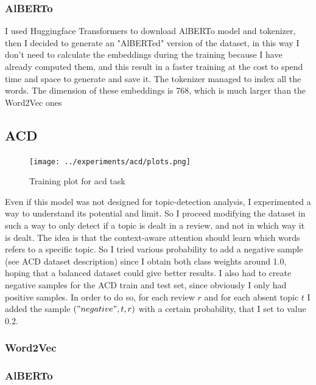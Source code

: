 \documentclass{article}
\begin{document}
            \subsubsection{AlBERTo}
            I used Huggingface Transformers to download AlBERTo model and tokenizer, then I decided to generate an "AlBERTed" version of the dataset,
            in this way I don't need to calculate the embeddings during the training because I have already computed them,
            and this result in a faster training at the cost to spend time and space to generate and save it.
            The tokenizer managed to index all the words.
            The dimension of these embeddings is 768, which is much larger than the Word2Vec ones

        \subsection{ACD}\label{subsec:s2}
            \begin{figure}
                \texttt{[image: ../experiments/acd/plots.png]}
                \caption{Training plot for acd task}
                \label{fig:train-acd}
            \end{figure}
            Even if this model was not designed for topic-detection analysis, I experimented a way to understand its potential and limit.
            So I proceed modifying the dataset in such a way to only detect if a topic is dealt in a review, and not in which way it is dealt.
            The idea is that the context-aware attention should learn which words refers to a specific topic.
            So I tried various probability to add a negative sample (see ACD dataset description) since I obtain both class weights around 1.0, hoping that a balanced dataset could give better results.
            I also had to create negative samples for the ACD train and test set, since obviously I only had positive samples.
            In order to do so, for each review $r$ and for each absent topic $t$ I added the sample $("negative", t, r)$ with a certain probability, that I set to value 0.2.

            \subsubsection{Word2Vec}

            \subsubsection{AlBERTo}
\end{document}
